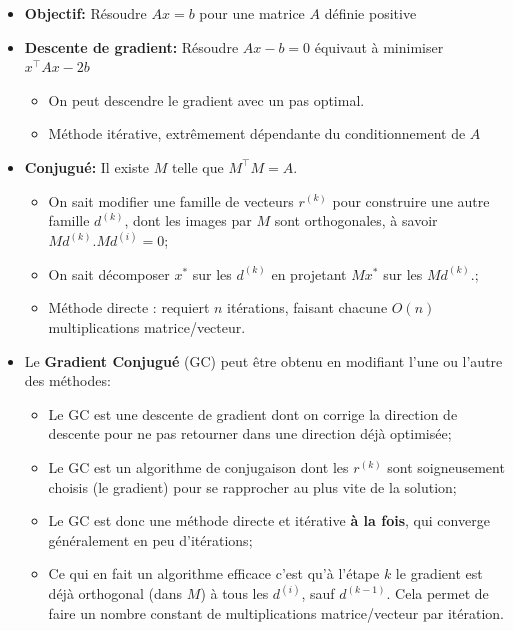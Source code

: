 \documentclass[notitlepage,oneside]{book}
\begin{document}
\begin{itemize}
\item {\bf Objectif:} Résoudre $Ax=b$ pour une matrice $A$ définie
  positive
\item {\bf Descente de gradient:} Résoudre $Ax-b =0$ équivaut à
  minimiser $x^\top Ax-2b$
  \begin{itemize}
  \item On peut descendre le gradient avec un pas optimal.
  \item Méthode itérative, extrêmement dépendante du conditionnement
    de $A$
  \end{itemize}
  
\item {\bf Conjugué:} Il existe $M$ telle que $M^\top M=A$.
  \begin{itemize}
  \item On sait modifier une famille de vecteurs $r^{(k)}$ pour
    construire une autre famille $d^{(k)}$, dont les images par $M$
    sont orthogonales, à savoir $Md^{(k)}.Md^{(i)}=0$;
  \item On sait décomposer $x^*$ sur les $d^{(k)}$ en projetant $Mx^*$
    sur les $Md^{(k)}$.;
  \item Méthode directe : requiert $n$ itérations, faisant chacune
    $O(n)$ multiplications matrice/vecteur.
  \end{itemize}
		
\item Le {\bf Gradient Conjugué} (GC) peut être obtenu en modifiant l'une
  ou l'autre des méthodes:
  \begin{itemize}
  \item Le GC est une descente de gradient dont on corrige la
    direction de descente pour ne pas retourner dans une direction
    déjà optimisée;
	
  \item Le GC est un algorithme de conjugaison dont les $r^{(k)}$ sont
    soigneusement choisis (le gradient) pour se rapprocher au plus
    vite de la solution;
    
  \item Le GC est donc une méthode directe et itérative \textbf{à la fois}, qui converge
    généralement en peu d'itérations;
	
  \item Ce qui en fait un algorithme efficace c'est qu'à l'étape $k$
    le gradient est déjà orthogonal (dans $M$) à tous les $d^{(i)}$,
    sauf $d^{(k-1)}$. Cela permet de faire un nombre constant de
    multiplications matrice/vecteur par itération.
	
  \end{itemize}
	
\end{itemize}
\end{document}
